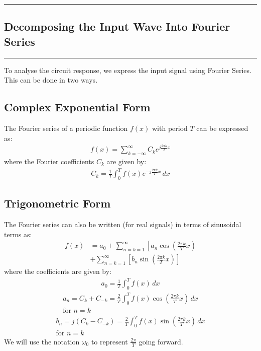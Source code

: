 \newpage
\begin{multicols}{2}
\tableofcontents
\end{multicols}
\newpage

{\color{gray}\hrule}
\begin{center}
\section{Decomposing the Input Wave Into Fourier Series}
\bigskip
\end{center}
{\color{gray}\hrule}
\begin{multicols}{2}

To analyse the circuit response, we express the input signal using Fourier Series. This can be done in two ways.

\subsection{Complex Exponential Form}
The Fourier series of a periodic function \( f(x) \) with period \( T \) can be expressed as:
\begin{align}
f(x) = \sum_{k=-\infty}^{\infty} C_k e^{j \frac{2\pi k}{T} x}  
\end{align}
where the Fourier coefficients \( C_k \) are given by:
\begin{align}
C_k = \frac{1}{T} \int_{0}^{T} f(x) e^{-j \frac{2\pi k}{T} x} \, dx \label{1}
\end{align}

\subsection{Trigonometric Form}
The Fourier series can also be written (for real signals) in terms of sinusoidal terms as:
\begin{equation}
\begin{split}
f(x) &= a_0 + \sum_{n=k=1}^{\infty} \left[ a_n \cos\left(\frac{2\pi k}{T} x \right) \right. \\
&+ \sum_{n=k=1}^{\infty} \left[ b_n \sin\left(\frac{2\pi k}{T} x \right) \right]
\end{split}
\end{equation}
where the coefficients are given by:
\begin{align}
a_0 = \frac{1}{T} \int_{0}^{T} f(x) \, dx \label{2}
\end{align}
\begin{align}
	a_n =C_k+C_{-k} = \frac{2}{T} \int_{0}^{T} f(x) \cos\left(\frac{2\pi k}{T} x \right) \, dx \label{3} \\ \text{for $n=k$}
\end{align}
\begin{align}
	b_n = j(C_k-C_{-k}) =\frac{2}{T} \int_{0}^{T} f(x) \sin\left(\frac{2\pi k}{T} x \right) \, dx \label{4} \\ \text{for $n=k$}
\end{align}
We will use the notation $\omega_0$ to represent $\frac{2\pi}{T}$ going forward.


\end{multicols}
